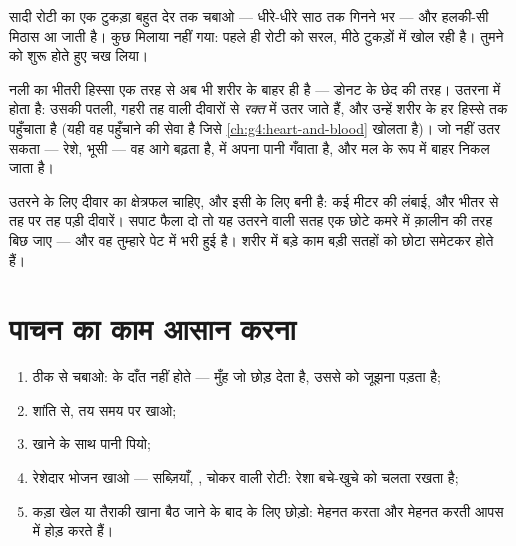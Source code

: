 \begin{example}[रोटी मीठी हो जाती है]\label{ex:g4:journey-of-food:sweet}
सादी रोटी का एक टुकड़ा बहुत देर तक चबाओ --- धीरे-धीरे साठ तक गिनने भर
--- और हलकी-सी मिठास आ जाती है। कुछ मिलाया नहीं गया:  पहले ही रोटी
को सरल, मीठे टुकड़ों में खोल रही है। तुमने  को शुरू होते हुए चख
लिया।
\end{example}

\begin{proposition}[शरीर में उतरना]\label{prop:g4:journey-of-food:absorb}
नली का भीतरी हिस्सा एक तरह से अब भी शरीर के बाहर ही है --- डोनट के
छेद की तरह। उतरना \emph{} में होता है: उसकी पतली, गहरी तह वाली
दीवारों से  \emph{रक्त} में उतर जाते हैं, और 
उन्हें शरीर के हर हिस्से तक पहुँचाता है (यही वह पहुँचाने की सेवा है
जिसे \cref{ch:g4:heart-and-blood} खोलता है)। जो नहीं उतर सकता ---
रेशे, भूसी --- वह आगे बढ़ता है,  में अपना पानी गँवाता है, और
मल के रूप में बाहर निकल जाता है।
\end{proposition}
\admitted

\begin{remark}[तहें और मीटर क्यों]\label{rem:g4:journey-of-food:surface}
उतरने के लिए दीवार का क्षेत्रफल चाहिए, और  इसी के लिए बनी है:
कई मीटर की लंबाई, और भीतर से तह पर तह पड़ी दीवारें। सपाट फैला दो तो
यह उतरने वाली सतह एक छोटे कमरे में क़ालीन की तरह बिछ जाए --- और वह
तुम्हारे पेट में भरी हुई है। शरीर में बड़े काम बड़ी सतहों को छोटा
समेटकर होते हैं।
\end{remark}

\section{पाचन का काम आसान करना}

\begin{method}[पाचन के अनुकूल आदतें]\label{met:g4:journey-of-food:habits}
\begin{enumerate}
  \item ठीक से चबाओ:  के दाँत नहीं होते --- मुँह जो छोड़ देता है,
        उससे  को जूझना पड़ता है;
  \item शांति से, तय समय पर खाओ;
  \item खाने के साथ पानी पियो;
  \item रेशेदार भोजन खाओ --- सब्ज़ियाँ, , चोकर वाली रोटी: रेशा
        बचे-खुचे को चलता रखता है;
  \item कड़ा खेल या तैराकी खाना बैठ जाने के बाद के लिए छोड़ो: मेहनत
        करता  और मेहनत करती  आपस में होड़ करते हैं।
\end{enumerate}
\end{method}


